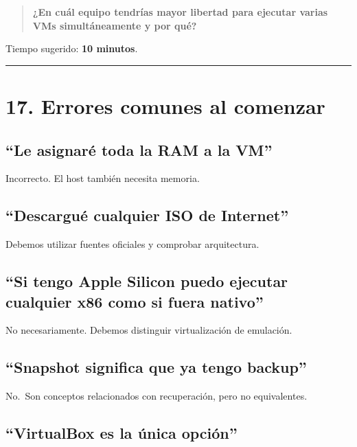 \documentclass[
  spanish,
  letterpaper,
]{scrbook}
\begin{document}
\begin{quote}
\textbf{¿En cuál equipo tendrías mayor libertad para ejecutar varias VMs
simultáneamente y por qué?}
\end{quote}

Tiempo sugerido: \textbf{10 minutos}.

\begin{center}\rule{0.5\linewidth}{0.5pt}\end{center}


\chapter{17. Errores comunes al
comenzar}\label{errores-comunes-al-comenzar}

\section{``Le asignaré toda la RAM a la
VM''}\label{le-asignaruxe9-toda-la-ram-a-la-vm}

Incorrecto. El host también necesita memoria.

\section{``Descargué cualquier ISO de
Internet''}\label{descarguuxe9-cualquier-iso-de-internet}

Debemos utilizar fuentes oficiales y comprobar arquitectura.

\section{``Si tengo Apple Silicon puedo ejecutar cualquier x86 como si
fuera
nativo''}\label{si-tengo-apple-silicon-puedo-ejecutar-cualquier-x86-como-si-fuera-nativo}

No necesariamente. Debemos distinguir virtualización de emulación.

\section{``Snapshot significa que ya tengo
backup''}\label{snapshot-significa-que-ya-tengo-backup}

No.~Son conceptos relacionados con recuperación, pero no equivalentes.

\section{``VirtualBox es la única
opción''}\label{virtualbox-es-la-uxfanica-opciuxf3n}
\end{document}
